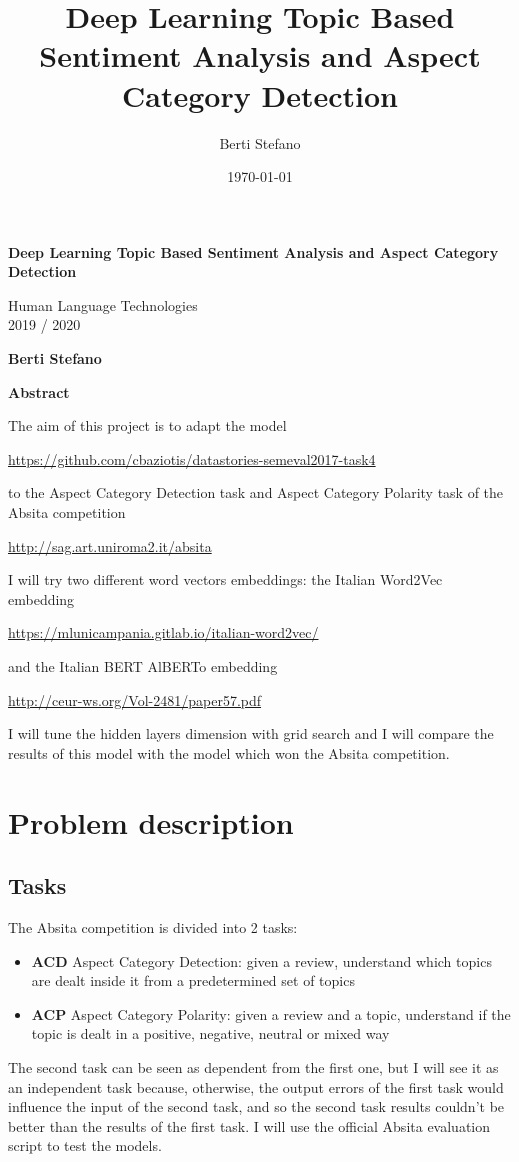 \documentclass{article}
\title{Deep Learning Topic Based Sentiment Analysis and Aspect Category Detection}
\author{Berti Stefano}
\date{\today}
\begin{document}
    \thispagestyle{plain}
    \begin{center}
        \Large
        \textbf{Deep Learning Topic Based Sentiment Analysis and Aspect Category Detection}

        \vspace{0.4cm}
        \large Human Language Technologies
        \\2019 / 2020

        \vspace{0.4cm}
        \textbf{Berti Stefano}

        \vspace{0.9cm}
        \textbf{Abstract}
    \end{center}
    The aim of this project is to adapt the model
    \\\centerline{\url{https://github.com/cbaziotis/datastories-semeval2017-task4}}
    to the Aspect Category Detection task and Aspect Category Polarity task of the Absita competition
    \\\centerline{\url{http://sag.art.uniroma2.it/absita}}
    I will try two different word vectors embeddings: the Italian Word2Vec embedding
    \\\centerline{\url{https://mlunicampania.gitlab.io/italian-word2vec/}}
    and the Italian BERT AlBERTo embedding
    \\\centerline{\url{http://ceur-ws.org/Vol-2481/paper57.pdf}}
    I will tune the hidden layers dimension with grid search and I will compare the results of this model with the model which won the Absita competition.

    \section{Problem description}\label{sec:s1}
        \subsection{Tasks}\label{subsec:task}
        The Absita competition is divided into 2 tasks:
        \begin{itemize}
            \item \textbf{ACD} Aspect Category Detection: given a review, understand which topics are dealt inside it from a predetermined set of topics
            \item \textbf{ACP} Aspect Category Polarity: given a review and a topic, understand if the topic is dealt in a positive, negative, neutral or mixed way
        \end{itemize}
        The second task can be seen as dependent from the first one, but I will see it as an independent task because, otherwise,
        the output errors of the first task would influence the input of the second task, and so the second task results couldn't be better than the results of the first task.
        I will use the official Absita evaluation script to test the models.
\end{document}
